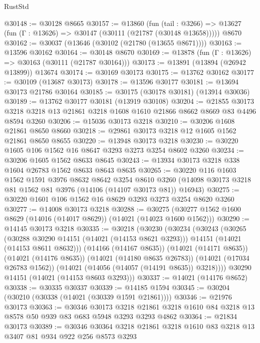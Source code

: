 \begin{lexlean}{RustStd}
\begin{coremodule}
@30148 := @30128 @8665
@30157 := @13860
    (fun (tail : @3266) => @13627 (fun (Γ : @13626) => @30147 (@30111 (@21787 (@30148 @13658)))))
    @8670
@30162 := @30037 (@13646 (@30102 (@21780 (@13655 @8671))))
@30163 := @13596 @30162
@30164 := @30148 @8670
@30169 := @13878 (fun (Γ : @13626) => @30163 (@30111 (@21787 @30164)))
@30173 := @13891 (@13894 (@26942 @13899)) @13674
@30174 := @30169 @30173
@30175 := @13762 @30162
@30177 := @30109 (@13687 @30173)
@30178 := @13596 @30177
@30181 := @13694 @30173 @21786 @30164
@30185 := @30175 (@30178 @30181) (@13914 @30036)
@30189 := @13762 @30177 @30181 (@13919 @30108)
@30204 := @21855
    @30173
    @3218
    @3218
    @13
    @21861
    @3218
    @1608
    @1610
    @21866
    @8662
    @8669
    @83
    @4496
    @8594
    @3260
@30206 := @15036 @30173 @3218
@30210 := @30206 @1608 @21861 @8650 @8660
@30218 := @29861 @30173 @3218 @12 @1605 @1562 @21861 @8650 @8655
@30220 := @13948 @30173 @3218
@30230 := @30220 @1605 @106 @1562 @16 @8647 @3293 @3273 @3254 @8602 @3260
@30234 := @30206 @1605 @1562 @8633 @8645
@30243 := @13934 @30173 @3218 @338 @1604 @26783 @1562 @8633 @8643 @8635
@30265 := @30220
    @116
    @1603
    @1562
    @1591
    @3976
    @8632
    @8642
    @3254
    @8610
    @3260
    (@14098 @30173 @3218 @81 @1562 @81 @3976 (@14106 (@14107 @30173 @81)) @16943)
@30275 := @30220 @1601 @106 @1562 @16 @8629 @3293 @3273 @3254 @8620 @3260
@30277 := @14008 @30173 @3218
@30288 := @30275 (@30277 @1562 @1600 @8629 (@14016 (@14017 @8629)) (@14021 (@14023 @1600 @1562)))
@30290 := @14145 @30173 @3218
@30335 := @30218
    (@30230
      (@30234
        (@30243
          (@30265
            (@30288 @30290 @14151 (@14021 (@14153 @8621 @3293)))
            @14151
            (@14021 (@14153 @8611 @8632)))
          (@14166 (@14167 @8635))
          (@14021 (@14171 @8635))
          (@14021 (@14176 @8635))
          (@14021 (@14180 @8635 @26783))
          (@14021 (@17034 @26783 @1562))
          (@14021 (@14056 (@14057 (@14191 @8635)) @3218))))
      @30290
      @14151
      (@14021 (@14153 @8603 @3293)))
@30337 := @14021 (@14176 @8652)
@30338 := @30335 @30337
@30339 := @14185 @1594
@30345 := @30204 (@30210 (@30338 (@14021 (@30339 @1591 @21861))))
@30346 := @21976 @30173
@30363 := @30346
    @30173
    @3218
    @21861
    @3218
    @1610
    @84
    @3218
    @13
    @8578
    @50
    @939
    @83
    @683
    @5948
    @3293
    @3293
    @4862
@30364 := @21834 @30173
@30389 := @30346
    @30364
    @3218
    @21861
    @3218
    @1610
    @83
    @3218
    @13
    @3407
    @81
    @934
    @922
    @256
    @8573
    @3293

\end{coremodule}
\end{lexlean}
